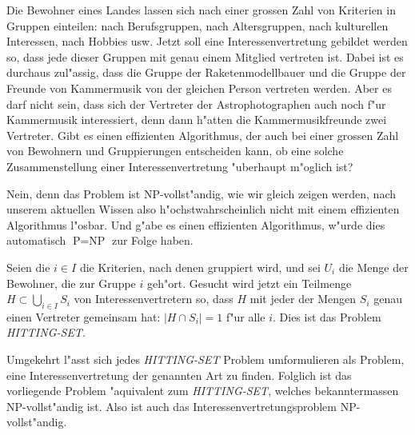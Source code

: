Die Bewohner eines Landes lassen sich nach einer grossen Zahl
von Kriterien in Gruppen einteilen: nach Berufsgruppen, nach
Altersgruppen, nach kulturellen Interessen, nach Hobbies usw.
Jetzt soll eine Interessenvertretung gebildet werden so, dass
jede dieser Gruppen mit genau einem Mitglied vertreten ist.
Dabei ist es durchaus zul"assig, dass die Gruppe der Raketenmodellbauer
und die Gruppe der Freunde von Kammermusik von der gleichen Person
vertreten werden. Aber es darf nicht sein, dass sich der Vertreter
der Astrophotographen auch noch f"ur Kammermusik interessiert, denn
dann h"atten die Kammermusikfreunde zwei Vertreter.
Gibt es einen effizienten Algorithmus, der auch bei einer grossen
Zahl von Bewohnern und Gruppierungen entscheiden kann, ob eine
solche Zusammenstellung einer Interessenvertretung "uberhaupt
m"oglich ist?

\begin{loesung}
Nein, denn das Problem ist NP-vollst"andig, wie wir gleich
zeigen werden, nach unserem aktuellen
Wissen also h"ochstwahrscheinlich nicht mit einem effizienten
Algorithmus l"osbar. Und g"abe es einen effizienten Algorithmus,
w"urde dies automatisch $\text{P}=\text{NP}$ zur Folge haben.

Seien die $i\in I$ die Kriterien, nach denen gruppiert wird,
und sei $U_i$ die Menge der Bewohner, die zur Gruppe $i$ geh"ort.
Gesucht wird jetzt ein Teilmenge $H\subset\bigcup_{i\in I}S_i$
von Interessenvertretern so, dass $H$ mit jeder der Mengen
$S_i$ genau einen Vertreter gemeinsam hat: $|H\cap S_i|=1$
f"ur alle $i$. Dies ist das Problem {\textsl{HITTING-SET}}. 

Umgekehrt l"asst sich jedes {\textsl{HITTING-SET}} Problem umformulieren
als Problem, eine Interessenvertretung der genannten Art zu finden.
Folglich ist das vorliegende Problem "aquivalent zum {\textsl{HITTING-SET}},
welches bekanntermassen NP-vollst"andig ist. Also ist auch das
Interessenvertretungsproblem NP-vollst"andig.
\end{loesung}
